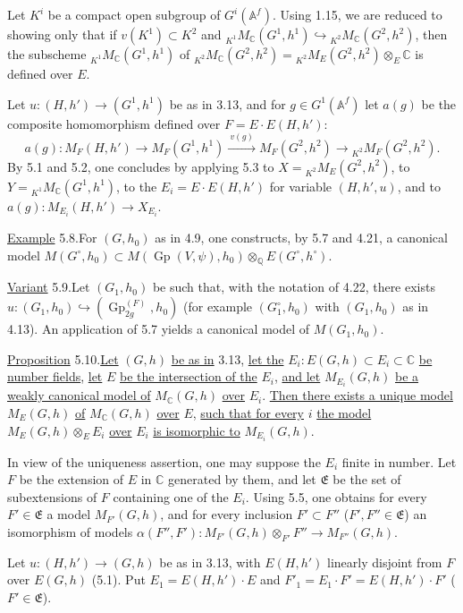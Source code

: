 \documentclass[10pt]{article}
\newcommand{\Af}{\mathbb A^f}
\newcommand{\C}{\mathbb C}
\newcommand{\Q}{\mathbb Q}
\newcommand{\Gp}{\operatorname{Gp}}
\newcommand{\MC}{M_{\C}}
\begin{document}
Let $K^i$ be a compact open subgroup of $G^i(\Af)$. Using 1.15, we are reduced to showing only that if $v(K^1)\subset K^2$ and ${}_{K^1}\MC(G^1,h^1)\hookrightarrow{}_{K^2}\MC(G^2,h^2)$, then the subscheme ${}_{K^1}\MC(G^1,h^1)$ of ${}_{K^2}\MC(G^2,h^2)={}_{K^2}M_E(G^2,h^2)\otimes_E\C$ is defined over $E$.

Let $u:(H,h')\to(G^1,h^1)$ be as in 3.13, and for $g\in G^1(\Af)$ let $a(g)$ be the composite homomorphism defined over $F=E\cdot E(H,h')$:
\[
a(g):M_F(H,h')\longrightarrow M_F(G^1,h^1)
 \xrightarrow{\ v(g)\ } M_F(G^2,h^2)
 \longrightarrow{}_{K^2}M_F(G^2,h^2).
\]
By 5.1 and 5.2, one concludes by applying 5.3 to $X={}_{K^2}M_E(G^2,h^2)$, to $Y={}_{K^1}\MC(G^1,h^1)$, to the $E_i=E\cdot E(H,h')$ for variable $(H,h',u)$, and to $a(g):M_{E_i}(H,h')\longrightarrow X_{E_i}$.

\noindent \uline{Example} 5.8.\quad For $(G,h_0)$ as in 4.9, one constructs, by 5.7 and 4.21, a canonical model $M(G^\circ,h_0)\subset M(\Gp(V,\psi),h_0)\otimes_{\Q}E(G^\circ,h^\circ)$.

\noindent \uline{Variant} 5.9.\quad Let $(G_1,h_0)$ be such that, with the notation of 4.22, there exists $u:(G_1,h_0)\hookrightarrow(\Gp_{2g}^{(F)},h_0)$ (for example $(G_1^\circ,h_0)$ with $(G_1,h_0)$ as in 4.13). An application of 5.7 yields a canonical model of $M(G_1,h_0)$.

\noindent \uline{Proposition} 5.10.\quad \uline{Let} $(G,h)$ \uline{be as in} 3.13, \uline{let the} $E_i:E(G,h)\subset E_i\subset\C$ \uline{be number fields}, \uline{let} $E$ \uline{be the intersection of the} $E_i$, \uline{and let} $M_{E_i}(G,h)$ \uline{be a weakly canonical model of} $\MC(G,h)$ \uline{over} $E_i$. \uline{Then there exists a unique model} $M_E(G,h)$ \uline{of} $\MC(G,h)$ \uline{over} $E$, \uline{such that for every} $i$ \uline{the model} $M_E(G,h)\otimes_EE_i$ \uline{over} $E_i$ \uline{is isomorphic to} $M_{E_i}(G,h)$.

In view of the uniqueness assertion, one may suppose the $E_i$ finite in number. Let $F$ be the extension of $E$ in $\C$ generated by them, and let $\mathfrak E$ be the set of subextensions of $F$ containing one of the $E_i$. Using 5.5, one obtains for every $F'\in\mathfrak E$ a model $M_{F'}(G,h)$, and for every inclusion $F'\subset F''$ ($F',F''\in\mathfrak E$) an isomorphism of models $\alpha(F'',F'):M_{F'}(G,h)\otimes_{F'}F''\longrightarrow M_{F''}(G,h)$.

Let $u:(H,h')\to(G,h)$ be as in 3.13, with $E(H,h')$ linearly disjoint from $F$ over $E(G,h)$ (5.1). Put $E_1=E(H,h')\cdot E$ and $F'_1=E_1\cdot F'=E(H,h')\cdot F'$ ($F'\in\mathfrak E$).
\end{document}
